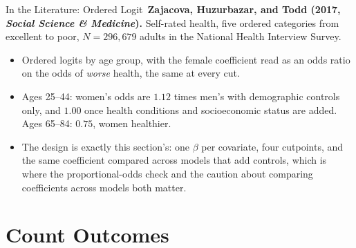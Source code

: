 \documentclass[aspectratio=169,11pt,xcolor=dvipsnames]{beamer}
\newcommand{\core}{\,\raisebox{0.6pt}{\textcolor{corestar}{$\bigstar$}}}
\begin{document}
\begin{frame}{In the Literature: Ordered Logit\core}
\textbf{Zajacova, Huzurbazar, and Todd (2017, \emph{Social Science \&
Medicine}).} Self-rated health, five ordered categories from excellent to
poor, $N = 296{,}679$ adults in the National Health Interview Survey.
\begin{itemize}\itemsep3pt
  \item Ordered logits by age group, with the female coefficient read as
        an odds ratio on the odds of \emph{worse} health, the same at
        every cut.
  \item Ages 25--44: women's odds are $1.12$ times men's with demographic
        controls only, and $1.00$ once health conditions and
        socioeconomic status are added. Ages 65--84: $0.75$, women
        healthier.
  \item The design is exactly this section's: one $\beta$ per covariate,
        four cutpoints, and the same coefficient compared across models
        that add controls, which is where the proportional-odds check and
        the caution about comparing coefficients across models both
        matter.
\end{itemize}
\end{frame}

\section[Counts]{Count Outcomes}
\begin{frame}\sectionpage\end{frame}
\end{document}
